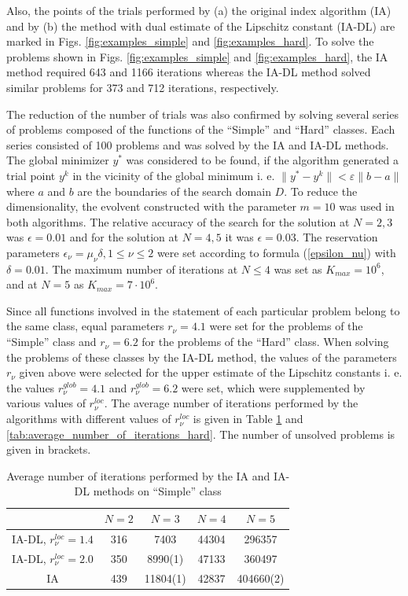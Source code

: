 \documentclass[review]{elsarticle}
\begin{document}
	Also, the points of the trials performed by (a) the original index algorithm (IA) and by (b) the method with dual estimate of the Lipschitz constant (IA-DL) are marked in Figs. \ref{fig:examples_simple} and \ref{fig:examples_hard}. To solve the problems shown in Figs. \ref{fig:examples_simple} and \ref{fig:examples_hard}, the IA method required 643 and 1166 iterations whereas the IA-DL method solved similar problems for 373 and 712 iterations, respectively.
	
	The reduction of the number of trials was also confirmed by solving several series of  problems composed of the functions of the “Simple” and “Hard” classes. Each series consisted of 100 problems and was solved by the IA and IA-DL methods. The global minimizer $y^{\ast}$ was considered to be found, if the algorithm generated a trial point $y^k$ in the vicinity of the global minimum i. e. $\| y^{\ast} - y^k \| < \varepsilon \|b - a\|$ where $a$ and $b$ are the boundaries of the search domain $D$. To reduce the dimensionality, the evolvent constructed with the parameter $m=10$ was used in both algorithms. The relative accuracy of the search for the solution at $N = 2, 3$ was $\epsilon=0.01$ and for the solution at $N=4,5$  it was $\epsilon=0.03$. The reservation parameters $\epsilon_{\nu}=\mu_{\nu} \delta,1 \leq \nu \leq 2$ were set according to formula (\ref{epsilon_nu}) with $\delta=0.01$. The maximum number of iterations at $N \leq 4$ was set as $K_{max} = 10^6$, and at $N=5$ as $K_{max}=7 \cdot 10^6$.

	Since all functions involved in the statement of each particular problem belong to the same class, equal parameters $r_{\nu}=4.1$ were set for the problems of the “Simple” class and $r_{\nu}=6.2$ for the problems of the “Hard” class. When solving the problems of these classes by the IA-DL method, the values of the parameters $r_{\nu}$ given above were selected for the upper estimate of the Lipschitz constants i. e. the values $r_{\nu}^{glob}=4.1$ and $r_{\nu}^{glob}=6.2$ were set, which were supplemented by various values of $r_{\nu}^{loc}$. The average number of iterations performed by the algorithms with different values of $r_{\nu}^{loc}$ is given in Table \ref{tab:average_number_of_iterations_simple} and \ref{tab:average_number_of_iterations_hard}. The number of unsolved problems is given in brackets.

\begin{table}[h!]
	\centering
		\begin{tabular}{ccccc}
			\hline
			& $N=2$ & $N=3$ & $N=4$ & $N=5$ \\
			\hline
			IA-DL, $r_{\nu}^{loc}=1.4$ & 316 & 7403 & 44304 & 296357 \\
			\hline
			IA-DL, $r_{\nu}^{loc}=2.0$ & 350 & 8990(1) & 47133 & 360497 \\
			\hline
			IA & 439 & 11804(1) & 42837 & 404660(2) \\
			\hline
		\end{tabular}
	\caption{Average number of iterations performed by the IA and IA-DL methods on “Simple” class}
	\label{tab:average_number_of_iterations_simple}
\end{table}
\end{document}

